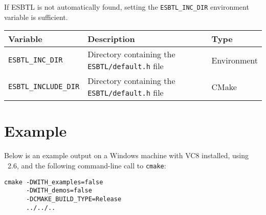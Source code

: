 If ESBTL is not automatically found, setting the \texttt{ESBTL\_INC\_DIR} 
environment variable is sufficient.

{\ccTexHtml{\small}{}
\renewcommand{\arraystretch}{1.3}
\gdef\lcTabularBorder{2}
\begin{tabular}{|l|l|l|} \hline
  \textbf{Variable}                    & \textbf{Description}                                         & \textbf{Type}\\\hline\hline
  \texttt{ESBTL\_INC\_DIR}     & Directory containing the \texttt{ESBTL/default.h} file & Environment\\\hline
  \texttt{ESBTL\_INCLUDE\_DIR}     & Directory containing the \texttt{ESBTL/default.h} file & CMake\\\hline
\end{tabular}
}


\section{Example} 

Below is an example output on a Windows machine with VC8 installed, using \cmake\ 2.6,
and the following command-line call to \texttt{cmake}:

{\ccTexHtml{\scriptsize}{}
\begin{verbatim}
cmake -DWITH_examples=false 
      -DWITH_demos=false 
      -DCMAKE_BUILD_TYPE=Release 
      ../../..
\end{verbatim}
}


